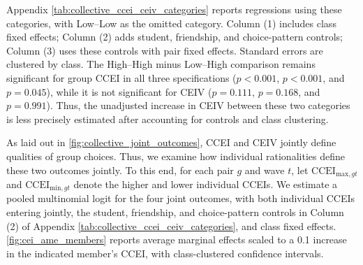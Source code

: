 \documentclass[11 pt]{article}
\begin{document}
Appendix \autoref{tab:collective_ccei_ceiv_categories} reports regressions using these categories, with Low--Low as the omitted category. Column (1) includes class fixed effects; Column (2) adds student, friendship, and choice-pattern controls; Column (3) uses these controls with pair fixed effects. Standard errors are clustered by class. The High--High minus Low--High comparison remains significant for group CCEI in all three specifications ($p<0.001$, $p<0.001$, and $p=0.045$), while it is not significant for CEIV ($p=0.111$, $p=0.168$, and $p=0.991$). Thus, the unadjusted increase in CEIV between these two categories is less precisely estimated after accounting for controls and class clustering.

As laid out in  \autoref{fig:collective_joint_outcomes}, CCEI and CEIV jointly define qualities of group choices.  Thus, we examine how individual rationalities define these two outcomes jointly. To this end, for each pair $g$ and wave $t$, let $\text{CCEI}_{\text{max},gt}$ and $\text{CCEI}_{\text{min},gt}$ denote the higher and lower individual CCEIs. We estimate a pooled multinomial logit for the four joint outcomes, with both individual CCEIs entering jointly, the student, friendship, and choice-pattern controls in Column (2) of Appendix \autoref{tab:collective_ccei_ceiv_categories}, and class fixed effects. \autoref{fig:cei_ame_members} reports average marginal effects scaled to a 0.1 increase in the indicated member's CCEI, with class-clustered confidence intervals.
\end{document}
